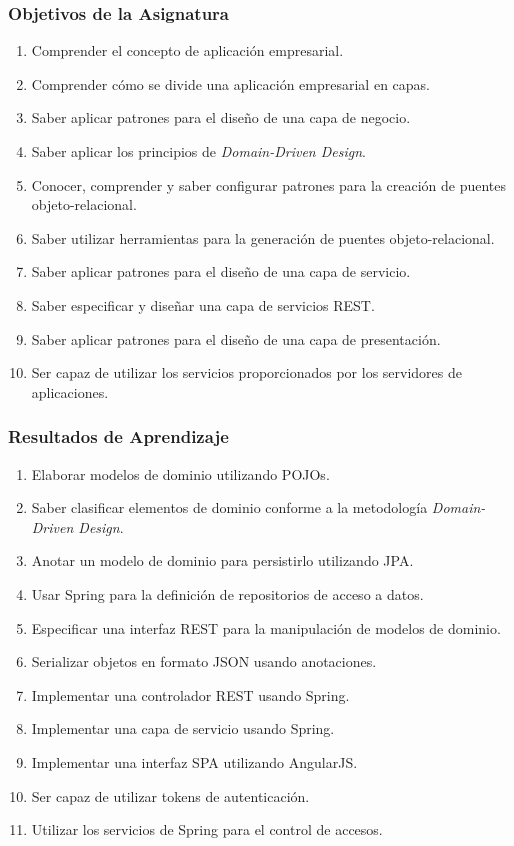 \documentclass[handout,a4paper,t,xcolor=pst,dvips,colortheme]{beamer}
\begin{document}
\begin{frame}[c]
   \frametitle{Objetivos de la Asignatura}
   \begin{enumerate}[<+->]
        \item Comprender el concepto de aplicación empresarial.
        \item Comprender cómo se divide una aplicación empresarial en capas.
        \item Saber aplicar patrones para el diseño de una capa de negocio.
        \item Saber aplicar los principios de \emph{Domain-Driven Design}.
        \item Conocer, comprender y saber configurar patrones para la creación de puentes objeto-relacional.
        \item Saber utilizar herramientas para la generación de puentes objeto-relacional.
        \item Saber aplicar patrones para el diseño de una capa de servicio.
        \item Saber especificar y diseñar una capa de servicios REST.
        \item Saber aplicar patrones para el diseño de una capa de presentación.
        \item Ser capaz de utilizar los servicios proporcionados por los servidores de aplicaciones.
	\end{enumerate}
\end{frame}

\begin{frame}[c]
   \frametitle{Resultados de Aprendizaje}
   \begin{enumerate}[<+->]
        \item Elaborar modelos de dominio utilizando POJOs.
        \item Saber clasificar elementos de dominio conforme a la metodología \emph{Domain-Driven Design}.
        \item Anotar un modelo de dominio para persistirlo utilizando JPA.
        \item Usar Spring para la definición de repositorios de acceso a datos.
        \item Especificar una interfaz REST para la manipulación de modelos de dominio.
        \item Serializar objetos en formato JSON usando anotaciones.
        \item Implementar una controlador REST usando Spring.
        \item Implementar una capa de servicio usando Spring.
        \item Implementar una interfaz SPA utilizando AngularJS.
        \item Ser capaz de utilizar tokens de autenticación.
        \item Utilizar los servicios de Spring para el control de accesos.
	\end{enumerate}
\end{frame}
\end{document}
